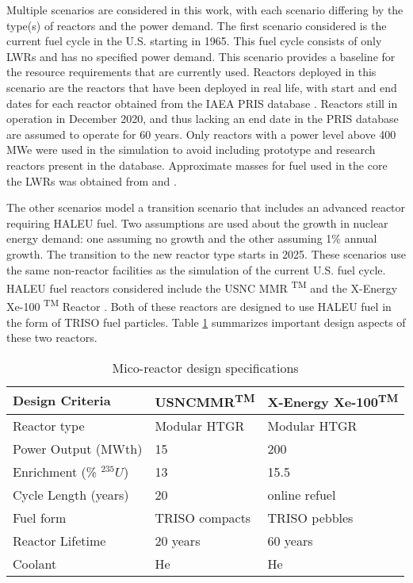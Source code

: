 Multiple scenarios are considered in this work, with each scenario differing
by the type(s) of reactors and the power demand. The first scenario considered 
is the current fuel cycle in the U.S. starting in 1965. This fuel cycle 
consists of only \gls{LWR}s
and has no specified power demand. This scenario provides a baseline for 
the resource requirements that are currently used. Reactors deployed in this 
scenario are the reactors that have been deployed in real life, with start and 
end dates for each reactor obtained from the \gls{IAEA} \gls{PRIS} database 
\cite{noauthor_power_1989}. Reactors still in operation in December 2020, and thus 
lacking an end date in the \gls{PRIS} database are assumed to operate for 60 
years. Only reactors with a power level above 400 MWe were used in the simulation 
to avoid including prototype and research reactors present in the database. 
Approximate masses for fuel used in the core the \gls{LWR}s was obtained 
from \cite{todreas_nuclear_2012} and \cite{cacuci_handbook_2010}. 

The other scenarios model a transition scenario that includes an advanced 
reactor requiring \gls{HALEU} fuel. Two assumptions are used about the growth 
in nuclear energy demand: one assuming no growth and the other assuming 
1\% annual growth. The transition to the new reactor type starts in 2025. 
These scenarios use the same  
non-reactor facilities as the simulation of the current 
U.S. fuel cycle. \gls{HALEU} fuel reactors 
considered include the \gls{USNC} \gls{MMR} \textsuperscript{TM}
\cite{mitchell_usnc_2020} and the X-Energy Xe-100 \textsuperscript{TM} 
Reactor \cite{harlan_x-energy_2018}\cite{hussain_advances_2018}. Both of 
these reactors are designed 
to use \gls{HALEU} fuel in the form of \gls{TRISO} fuel particles. Table 
\ref{tab:reactor_summary} summarizes important design aspects of these two reactors.

\begin{table}[ht]
    \caption{Mico-reactor design specifications}
    \label{tab:reactor_summary}
    \begin{tabular}{p{5cm}p{5cm}p{5cm}}
        \hline
        Design Criteria & \gls{USNC}\gls{MMR}\textsuperscript{TM} & 
            X-Energy Xe-100\textsuperscript{TM} \\\hline
        Reactor type & Modular HTGR & Modular HTGR \\
        Power Output (MWth) & 15 & 200 \\
        Enrichment (\% $^{235}U$) & 13 & 15.5 \\
        Cycle Length (years) & 20 & online refuel\\
        Fuel form & \gls{TRISO} compacts & \gls{TRISO} pebbles\\
        Reactor Lifetime & 20 years & 60 years \\
        Coolant & He & He \\
        \hline
    \end{tabular}
\end{table}
    
